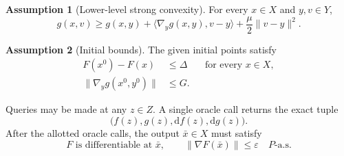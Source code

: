 \documentclass[10pt]{article}
\theoremstyle{definition}
\newtheorem{assumption}{Assumption}
\begin{document}
\begin{assumption}[Lower-level strong convexity]
For every $x\in X$ and $y,v\in Y$,
\[
g(x,v)\geq g(x,y)
+\langle\nabla_y g(x,y),v-y\rangle
+\frac{\mu}{2}\|v-y\|^2.
\]
\end{assumption}

\begin{assumption}[Initial bounds]
The given initial points satisfy
\[
\begin{aligned}
F(x^0)-F(x)&\leq\Delta &&\text{for every }x\in X,\\
\|\nabla_y g(x^0,y^0)\|&\leq G.
\end{aligned}
\]
\end{assumption}

Queries may be made at any $z\in Z$. A single oracle call returns the exact tuple
\[
\bigl(f(z),g(z),\mathrm{d}f(z),\mathrm{d}g(z)\bigr).
\]
After the allotted oracle calls, the output $\bar{x}\in X$ must satisfy
\[
F\text{ is differentiable at }\bar{x},
\qquad \|\nabla F(\bar{x})\|\leq\varepsilon
\quad P\text{-a.s.}
\]
\end{document}
